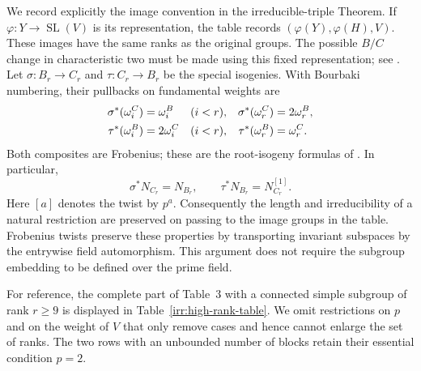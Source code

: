 We record explicitly the image convention in the irreducible-triple Theorem.
If $\varphi:Y\longrightarrow\operatorname{SL}(V)$ is its representation, the
table records $(\varphi(Y),\varphi(H),V)$.  These images have the same ranks as
the original groups.  The possible $B/C$ change in characteristic two must
be made using this fixed representation; see
\cite[Lemma~2.1 and Remark~4.2(b)]{BurnessTesterman2018}.
Let $\sigma:B_r\longrightarrow C_r$ and $\tau:C_r\longrightarrow B_r$ be the
special isogenies.  With Bourbaki numbering, their pullbacks on fundamental
weights are
\begin{align}
 \sigma^*(\omega_i^C)&=\omega_i^B &&(i<r), &
 \sigma^*(\omega_r^C)&=2\omega_r^B,\notag\\
 \tau^*(\omega_i^B)&=2\omega_i^C &&(i<r), &
 \tau^*(\omega_r^B)&=\omega_r^C.
 \label{irr:bc-weights}
\end{align}
Both composites are Frobenius; these are the root-isogeny formulas of
\cite[Chapter~I, Section~3.2]{DowdSin1996}.  In particular,
\begin{equation}
 \sigma^*N_{C_r}=N_{B_r},\qquad
 \tau^*N_{B_r}=N_{C_r}^{[1]}.
 \label{irr:bc-natural}
\end{equation}
Here $[a]$ denotes the twist by $p^a$.
Consequently the length and irreducibility of a natural restriction are
preserved on passing to the image groups in the table.  Frobenius twists
preserve these properties by transporting invariant subspaces by the
entrywise field automorphism.  This argument does not require the subgroup
embedding to be defined over the prime field.

For reference, the complete part of Table~3 with a connected simple subgroup
of rank $r\geq9$ is displayed in Table~\ref{irr:high-rank-table}.
We omit restrictions on $p$ and on the weight of $V$ that only remove cases
and hence cannot enlarge the set of ranks.  The two rows with an unbounded
number of blocks retain their essential condition $p=2$.

